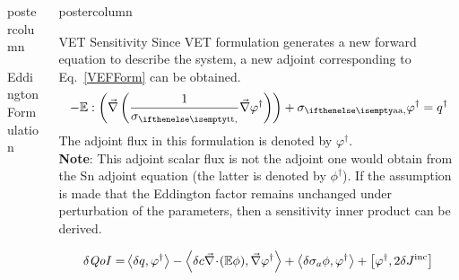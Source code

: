 \documentclass[xcolor={usenames,dvipsnames,svgnames,table}]{beamer}
\newcommand{\vr}{\vec{r}}
\newcommand{\bra}{\left\langle}
\newcommand{\ket}{\right\rangle}
\newcommand{\sbra}{\left[}
\newcommand{\sket}{\right]}
\newcommand{\bound}{\partial V}
\newcommand{\Edd}{\mathbb{E}}
\newcommand{\isigt}{c}
\newcommand{\scalResp}{q^\dag}
\newcommand{\qoi}{{\it QoI}\xspace}
\newlength{\columnheight}
\begin{document}
\begin{frame}
\begin{columns}
\begin{column}{.33\textwidth}
\begin{beamercolorbox}[center,wd=\textwidth]{postercolumn}
\begin{minipage}[T]{0.95\textwidth}
{\begin{block}{Eddington Formulation}
\end{block}
\vfill

			}
			\end{minipage}
		\end{beamercolorbox}
	\end{column}

	\begin{column}{.33\textwidth}
		\begin{beamercolorbox}[center,wd=\textwidth]{postercolumn}
			\begin{minipage}[T]{0.95\textwidth} %
			\parbox[t][\columnheight]{\textwidth}{ %


			    \begin{block}{VET Sensitivity}
Since VET formulation generates a new forward equation to describe the system, a new adjoint corresponding to Eq.~\eqref{VEFForm} can be obtained. 
\begin{equation}
\label{adjForm}
- \Edd : \left( \grad \left( \frac{1}{\sigt}\grad \varphi^\dag \right) \right) + \siga \varphi^\dag = \scalResp %
\end{equation}
The adjoint flux in this formulation is denoted by $\varphi^\dag$.\\
{\bf Note}:  This adjoint scalar flux is not the adjoint one would obtain from the Sn adjoint equation (the latter is denoted by $\phi^\dag$).
\vspace{1cm}
If the assumption is made that the Eddington factor remains unchanged under perturbation of the parameters, then a sensitivity inner product can be derived.


\begin{equation}
\label{SensIP1}
\begin{split}
\delta \qoi =&  \bra \delta q , \varphi^\dag \ket - \bra \delta \isigt \div (\Edd \phi), \grad \varphi^\dag \ket + \bra \delta \sigma_a \phi, \varphi^\dag \ket + \sbra \varphi^\dag, 2 \delta J^{\text{inc}} \sket \\
\end{split}
\end{equation}


\end{block}}
\end{minipage}
\end{beamercolorbox}
\end{column}
\end{columns}
\end{frame}
\end{document}
